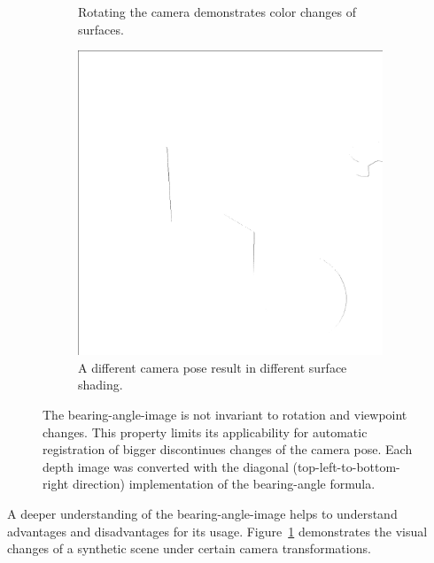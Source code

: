 \begin{figure}[H]
\begin{subfigure}[t]{0.32\textwidth}
        \caption{Rotating the camera demonstrates color changes of surfaces.}
    \end{subfigure}
    \begin{subfigure}[t]{0.32\textwidth}
        \includegraphics[width=\linewidth]{chapter04/img/bearing-diag-0210.png}
        \caption{A different camera pose result in different surface shading.}
    \end{subfigure}
    \caption[Bearing Angle Image Characteristics demonstrated]{The \gls{bearing-angle-image} is not invariant to rotation and viewpoint changes. This property limits its applicability for automatic registration of bigger discontinues changes of the camera pose. Each depth image was converted with the diagonal (top-left-to-bottom-right direction) implementation of the \gls{bearing-angle} formula.}\label{fig:bearing_characteristics}
\end{figure}
A deeper understanding of the \gls{bearing-angle-image} helps to understand advantages and disadvantages for its usage.
Figure~\ref{fig:bearing_characteristics} demonstrates the visual changes of a synthetic scene under certain camera transformations.

